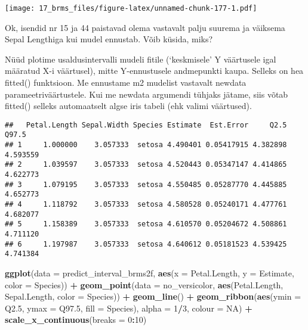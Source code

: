 \documentclass[]{article}
\newenvironment{Shaded}{\begin{snugshade}}{\end{snugshade}}
\newcommand{\KeywordTok}[1]{\textcolor[rgb]{0.13,0.29,0.53}{\textbf{#1}}}
\newcommand{\DataTypeTok}[1]{\textcolor[rgb]{0.13,0.29,0.53}{#1}}
\newcommand{\DecValTok}[1]{\textcolor[rgb]{0.00,0.00,0.81}{#1}}
\newcommand{\StringTok}[1]{\textcolor[rgb]{0.31,0.60,0.02}{#1}}
\newcommand{\OtherTok}[1]{\textcolor[rgb]{0.56,0.35,0.01}{#1}}
\newcommand{\OperatorTok}[1]{\textcolor[rgb]{0.81,0.36,0.00}{\textbf{#1}}}
\newcommand{\NormalTok}[1]{#1}
\begin{document}
\texttt{[image: 17\_brms\_files/figure-latex/unnamed-chunk-177-1.pdf]}

Ok, isendid nr 15 ja 44 paistavad olema vastavalt palju suurema ja
väiksema Sepal Lengthiga kui mudel ennustab. Võib küsida, miks?

Nüüd plotime usaldusintervalli mudeli fitile (`keskmisele' Y väärtusele
igal määratud X-i väärtusel), mitte Y-ennustusele andmepunkti kaupa.
Selleks on hea fitted() funktsioon. Me ennustame m2 mudelist vastavalt
newdata parameetriväärtustele. Kui me newdata argumendi tühjaks jätame,
siis võtab fitted() selleks automaatselt algse iris tabeli (ehk valimi
väärtused).

\begin{Shaded}
\end{Shaded}

\begin{verbatim}
##   Petal.Length Sepal.Width Species Estimate  Est.Error     Q2.5    Q97.5
## 1     1.000000    3.057333  setosa 4.490401 0.05417915 4.382898 4.593559
## 2     1.039597    3.057333  setosa 4.520443 0.05347147 4.414865 4.622773
## 3     1.079195    3.057333  setosa 4.550485 0.05287770 4.445885 4.652773
## 4     1.118792    3.057333  setosa 4.580528 0.05240171 4.477761 4.682077
## 5     1.158389    3.057333  setosa 4.610570 0.05204672 4.508861 4.711120
## 6     1.197987    3.057333  setosa 4.640612 0.05181523 4.539425 4.741384
\end{verbatim}

\begin{Shaded}
\begin{Highlighting}[]
\KeywordTok{ggplot}\NormalTok{(}\DataTypeTok{data =}\NormalTok{ predict_interval_brms2f, }\KeywordTok{aes}\NormalTok{(}\DataTypeTok{x =}\NormalTok{ Petal.Length, }\DataTypeTok{y =}\NormalTok{ Estimate, }\DataTypeTok{color =}\NormalTok{ Species)) }\OperatorTok{+}
\StringTok{  }\KeywordTok{geom_point}\NormalTok{(}\DataTypeTok{data =}\NormalTok{ no_versicolor, }\KeywordTok{aes}\NormalTok{(Petal.Length, Sepal.Length, }\DataTypeTok{color =}\NormalTok{ Species)) }\OperatorTok{+}
\StringTok{  }\KeywordTok{geom_line}\NormalTok{() }\OperatorTok{+}
\StringTok{  }\KeywordTok{geom_ribbon}\NormalTok{(}\KeywordTok{aes}\NormalTok{(}\DataTypeTok{ymin =}\NormalTok{ Q2.}\DecValTok{5}\NormalTok{, }\DataTypeTok{ymax =}\NormalTok{ Q97.}\DecValTok{5}\NormalTok{, }\DataTypeTok{fill =}\NormalTok{ Species), }\DataTypeTok{alpha =} \DecValTok{1}\OperatorTok{/}\DecValTok{3}\NormalTok{, }\DataTypeTok{colour =} \OtherTok{NA}\NormalTok{) }\OperatorTok{+}
\StringTok{  }\KeywordTok{scale_x_continuous}\NormalTok{(}\DataTypeTok{breaks =} \DecValTok{0}\OperatorTok{:}\DecValTok{10}\NormalTok{)}
\end{Highlighting}
\end{Shaded}
\end{document}

